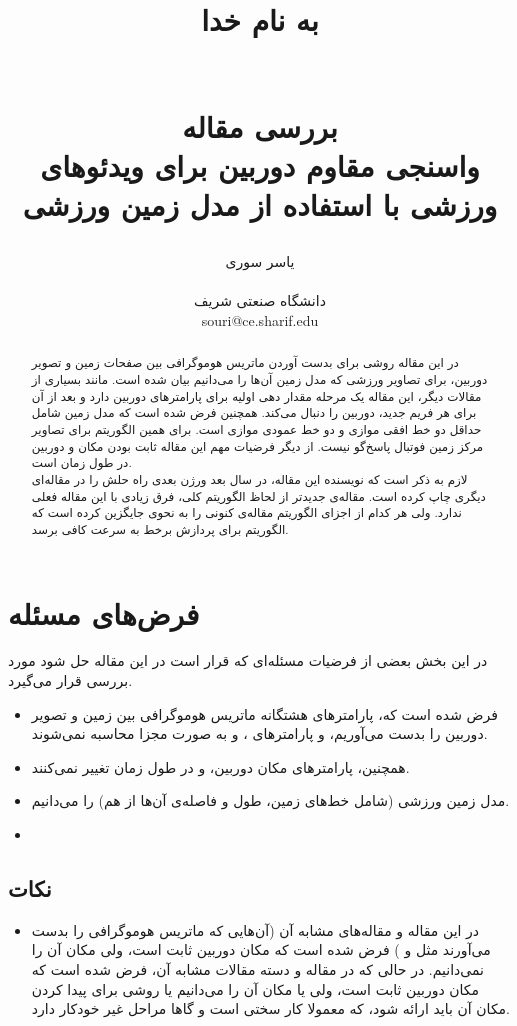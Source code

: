 \documentclass{report}
\title{
\begin{normalsize}
به نام خدا
\end{normalsize}
\\[2cm]
بررسی مقاله
\\[1cm]
واسنجی مقاوم دوربین برای ویدئوهای ورزشی با استفاده از مدل زمین ورزشی
}
\author{یاسر سوری
\\
\\ \small دانشگاه صنعتی شریف
\\ \small souri@ce.sharif.edu
}
\begin{document}
\maketitle

\begin{abstract}
در این مقاله روشی برای بدست آوردن ماتریس هوموگرافی بین صفحات زمین و تصویر دوربین، برای تصاویر ورزشی که مدل زمین آن‌ها را می‌دانیم بیان شده است. مانند بسیاری از مقالات دیگر، این مقاله یک مرحله مقدار دهی اولیه برای پارامترهای دوربین دارد و بعد از آن برای هر فریم جدید، دوربین را دنبال  می‌کند. همچنین فرض شده است که مدل زمین شامل حداقل دو خط افقی موازی و دو خط عمودی موازی است. برای همین الگوریتم برای تصاویر مرکز زمین فوتبال پاسخ‌گو نیست. از دیگر فرضیات مهم این مقاله ثابت بودن مکان و  دوربین در طول زمان است.
\\
لازم به ذکر است که نویسنده این مقاله، در سال بعد ورژن بعدی راه حلش را در مقاله‌ای دیگری چاپ کرده است\cite{new_paper}. مقاله‌ی جدیدتر از لحاظ الگوریتم کلی، فرق زیادی با این مقاله فعلی ندارد. ولی هر کدام از اجزای الگوریتم مقاله‌ی کنونی را به نحوی جایگزین کرده است که الگوریتم برای پردازش برخط به سرعت کافی برسد.

\end{abstract}

\section{فرض‌های مسئله}
در این بخش بعضی از فرضیات مسئله‌ای که قرار است در این مقاله حل شود مورد بررسی قرار می‌گیرد.
\begin{itemize}
\item
فرض شده است که، پارامتر‌های هشتگانه ماتریس هوموگرافی بین زمین و تصویر دوربین را بدست می‌آوریم، و پارامترهای ،  و  به صورت مجزا محاسبه نمی‌شوند.
\item
همچنین، پارامترهای مکان دوربین،  و  در طول زمان تغییر نمی‌کنند.
\item
مدل زمین ورزشی (شامل خط‌های زمین، طول و فاصله‌ی آن‌ها از هم) را می‌دانیم.
\item

\end{itemize}
\subsection{نکات}
\begin{itemize}
\item
در این مقاله و مقاله‌های مشابه آن (آن‌هایی که ماتریس هوموگرافی را بدست می‌آورند مثل \cite{new_paper} و \cite{tunesiha}) فرض شده است که مکان دوربین ثابت است، ولی مکان آن را نمی‌دانیم. در حالی که در مقاله \cite{thomas.2007}و دسته‌ مقالات مشابه آن، فرض شده است که مکان دوربین ثابت است، ولی یا مکان آن را می‌دانیم یا روشی برای پیدا کردن مکان آن باید ارائه شود، که معمولا کار سختی است و گاها مراحل غیر خودکار دارد.
\end{itemize}
\end{document}
